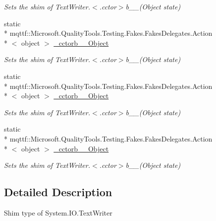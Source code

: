 \begin{DoxyCompactItemize}
\begin{DoxyCompactList}\small\item\em Sets the shim of Text\-Writer.$<$.cctor$>$b\-\_\-\-\_(\-Object state)\end{DoxyCompactList}\item 
static \\*
mqttf\-::\-Microsoft.\-Quality\-Tools.\-Testing.\-Fakes.\-Fakes\-Delegates.\-Action\\*
$<$ object $>$ \hyperlink{class_system_1_1_i_o_1_1_fakes_1_1_shim_text_writer_aa26ab7dca39a3773611948cc10b16608}{\-\_\-cctorb\-\_\-\-\_\-Object}
\begin{DoxyCompactList}\small\item\em Sets the shim of Text\-Writer.$<$.cctor$>$b\-\_\-\-\_(\-Object state)\end{DoxyCompactList}\item 
static \\*
mqttf\-::\-Microsoft.\-Quality\-Tools.\-Testing.\-Fakes.\-Fakes\-Delegates.\-Action\\*
$<$ object $>$ \hyperlink{class_system_1_1_i_o_1_1_fakes_1_1_shim_text_writer_a6c373bd032cace75a93ef9a9a9ac7766}{\-\_\-cctorb\-\_\-\-\_\-Object}
\begin{DoxyCompactList}\small\item\em Sets the shim of Text\-Writer.$<$.cctor$>$b\-\_\-\-\_(\-Object state)\end{DoxyCompactList}\item 
static \\*
mqttf\-::\-Microsoft.\-Quality\-Tools.\-Testing.\-Fakes.\-Fakes\-Delegates.\-Action\\*
$<$ object $>$ \hyperlink{class_system_1_1_i_o_1_1_fakes_1_1_shim_text_writer_aadd8da7e1bd704cbe40b1348fd690b32}{\-\_\-cctorb\-\_\-\-\_\-Object}
\begin{DoxyCompactList}\small\item\em Sets the shim of Text\-Writer.$<$.cctor$>$b\-\_\-\-\_(\-Object state)\end{DoxyCompactList}\end{DoxyCompactItemize}


\subsection{Detailed Description}
Shim type of System.\-I\-O.\-Text\-Writer



